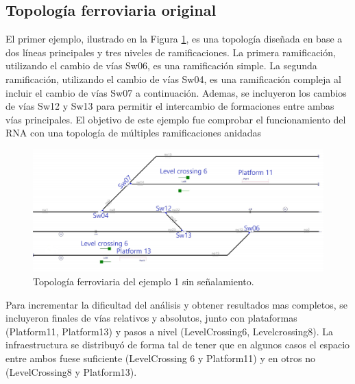 \subsection{Topología ferroviaria original}

El primer ejemplo, ilustrado en la Figura \ref{fig:EJ1_1}, es una topología diseñada en base a dos líneas principales y tres niveles de ramificaciones. La primera ramificación, utilizando el cambio de vías Sw06, es una ramificación simple. La segunda ramificación, utilizando el cambio de vías Sw04, es una ramificación compleja al incluir el cambio de vías Sw07 a continuación. Ademas, se incluyeron los cambios de vías Sw12 y Sw13 para permitir el intercambio de formaciones entre ambas vías principales. El objetivo de este ejemplo fue comprobar el funcionamiento del RNA con una topología de múltiples ramificaciones anidadas

\begin{figure}[h]
	\centering
	\includegraphics[width=1\textwidth]{resultados-obtenidos/ejemplo1/images/1_empty.png}
	\centering\caption{Topología ferroviaria del ejemplo 1 sin señalamiento.}
	\label{fig:EJ1_1}
\end{figure}

Para incrementar la dificultad del análisis y obtener resultados mas completos, se incluyeron finales de vías relativos y absolutos, junto con plataformas (Platform11, Platform13) y pasos a nivel (LevelCrossing6, Levelcrossing8). La infraestructura se distribuyó de forma tal de tener que en algunos casos el espacio entre ambos fuese suficiente (LevelCrossing 6 y Platform11) y en otros no (LevelCrossing8 y Platform13).